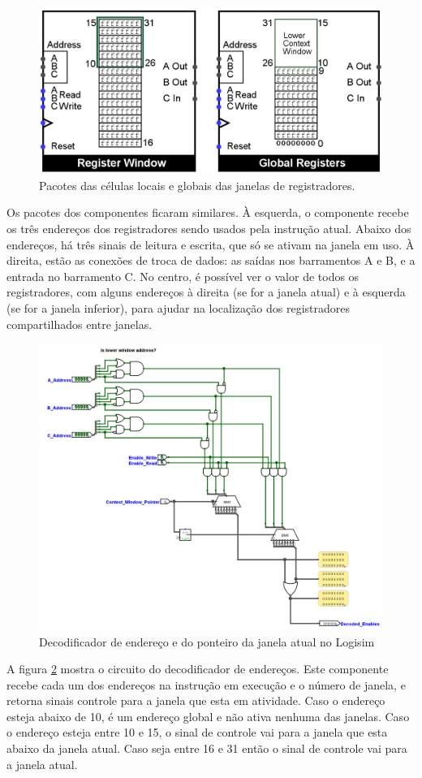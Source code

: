 \documentclass[
	article,			%
	11pt,				%
	oneside,			%
	a4paper,			%
	english,			%
	brazil,				%
	sumario=tradicional
	]{abntex2}
\begin{document}
\begin{figure}[H]
    \centering
    \includegraphics[width=0.5\linewidth]{Logisim/windowCellsPack.png}
    \caption{Pacotes das células locais e globais das janelas de registradores.}
    \label{fig:windowCellsPack}
\end{figure}
Os pacotes dos componentes ficaram similares. À esquerda, o componente recebe os três endereços dos registradores sendo usados pela instrução atual. Abaixo dos endereços, há três sinais de leitura e escrita, que só se ativam na janela em uso. À direita, estão as conexões de troca de dados: as saídas nos barramentos A e B, e a entrada no barramento C. No centro, é possível ver o valor de todos os registradores, com alguns endereços à direita (se for a janela atual) e à esquerda (se for a janela inferior), para ajudar na localização dos registradores compartilhados entre janelas.  
\begin{figure}[H]
    \centering
    \includegraphics[width=0.75\linewidth]{cwpDecoder.png}
    \caption{Decodificador de endereço e do ponteiro da janela atual no Logisim}
    \label{fig:cwpDecoder}
\end{figure}
A figura \ref{fig:cwpDecoder} mostra o circuito do decodificador de endereços. Este componente recebe cada um dos endereços na instrução em execução e o número de janela, e retorna sinais controle para a janela que esta em atividade.  Caso o endereço esteja abaixo de 10, é um endereço global e não ativa nenhuma das janelas. Caso o endereço esteja entre 10 e 15, o sinal de controle vai para a janela que esta abaixo da janela atual. Caso seja entre 16 e 31 então o sinal de controle vai para a janela atual. 
\end{document}
